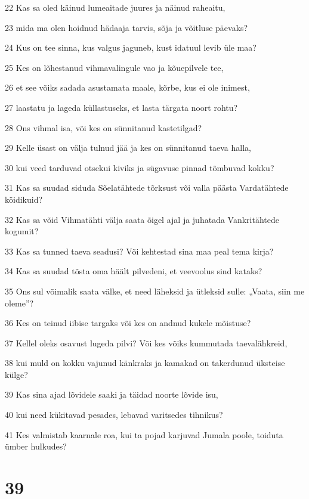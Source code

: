 \par 22 Kas sa oled käinud lumeaitade juures ja näinud raheaitu,
\par 23 mida ma olen hoidnud hädaaja tarvis, sõja ja võitluse päevaks?
\par 24 Kus on tee sinna, kus valgus jaguneb, kust idatuul levib üle maa?
\par 25 Kes on lõhestanud vihmavalingule vao ja kõuepilvele tee,
\par 26 et see võiks sadada asustamata maale, kõrbe, kus ei ole inimest,
\par 27 laastatu ja lageda küllastuseks, et lasta tärgata noort rohtu?
\par 28 Ons vihmal isa, või kes on sünnitanud kastetilgad?
\par 29 Kelle üsast on välja tulnud jää ja kes on sünnitanud taeva halla,
\par 30 kui veed tarduvad otsekui kiviks ja sügavuse pinnad tõmbuvad kokku?
\par 31 Kas sa suudad siduda Sõelatähtede tõrksust või valla päästa Vardatähtede köidikuid?
\par 32 Kas sa võid Vihmatähti välja saata õigel ajal ja juhatada Vankritähtede kogumit?
\par 33 Kas sa tunned taeva seadusi? Või kehtestad sina maa peal tema kirja?
\par 34 Kas sa suudad tõsta oma häält pilvedeni, et veevoolus sind kataks?
\par 35 Ons sul võimalik saata välke, et need läheksid ja ütleksid sulle: „Vaata, siin me oleme”?
\par 36 Kes on teinud iibise targaks või kes on andnud kukele mõistuse?
\par 37 Kellel oleks osavust lugeda pilvi? Või kes võiks kummutada taevalähkreid,
\par 38 kui muld on kokku vajunud känkraks ja kamakad on takerdunud üksteise külge?
\par 39 Kas sina ajad lõvidele saaki ja täidad noorte lõvide isu,
\par 40 kui need kükitavad pesades, lebavad varitsedes tihnikus?
\par 41 Kes valmistab kaarnale roa, kui ta pojad karjuvad Jumala poole, toiduta ümber hulkudes?

\chapter{39}

